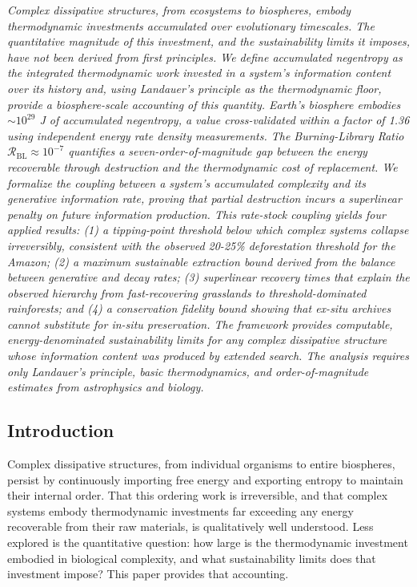 \documentclass[11pt]{article}
\theoremstyle{plain}
\theoremstyle{definition}
\theoremstyle{remark}
\let\origsubsection\subsection
\renewcommand{\subsection}{\needspace{7\baselineskip}\origsubsection}
\begin{document}
\emph{Complex dissipative structures, from ecosystems to biospheres,
embody thermodynamic investments accumulated over evolutionary
timescales. The quantitative magnitude of this investment, and the
sustainability limits it imposes, have not been derived from first
principles. We define accumulated negentropy as the integrated
thermodynamic work invested in a system's information content over its
history and, using Landauer's principle as the thermodynamic floor,
provide a biosphere-scale accounting of this quantity. Earth's biosphere
embodies \(\sim 10^{29}\) J of accumulated negentropy, a value
cross-validated within a factor of 1.36 using independent energy rate
density measurements. The Burning-Library Ratio
\(\mathcal{R}_{\text{BL}} \approx 10^{-7}\) quantifies a
seven-order-of-magnitude gap between the energy recoverable through
destruction and the thermodynamic cost of replacement. We formalize the
coupling between a system's accumulated complexity and its generative
information rate, proving that partial destruction incurs a superlinear
penalty on future information production. This rate-stock coupling
yields four applied results: (1) a tipping-point threshold below which
complex systems collapse irreversibly, consistent with the observed
20-25\% deforestation threshold for the Amazon; (2) a maximum
sustainable extraction bound derived from the balance between generative
and decay rates; (3) superlinear recovery times that explain the
observed hierarchy from fast-recovering grasslands to
threshold-dominated rainforests; and (4) a conservation fidelity bound
showing that ex-situ archives cannot substitute for in-situ
preservation. The framework provides computable, energy-denominated
sustainability limits for any complex dissipative structure whose
information content was produced by extended search. The analysis
requires only Landauer's principle, basic thermodynamics, and
order-of-magnitude estimates from astrophysics and biology.}

\subsection{Introduction}\label{introduction-3}

Complex dissipative structures, from individual organisms to entire
biospheres, persist by continuously importing free energy and exporting
entropy to maintain their internal order. That this ordering work is
irreversible, and that complex systems embody thermodynamic investments
far exceeding any energy recoverable from their raw materials, is
qualitatively well understood. Less explored is the quantitative
question: how large is the thermodynamic investment embodied in
biological complexity, and what sustainability limits does that
investment impose? This paper provides that accounting.
\end{document}

